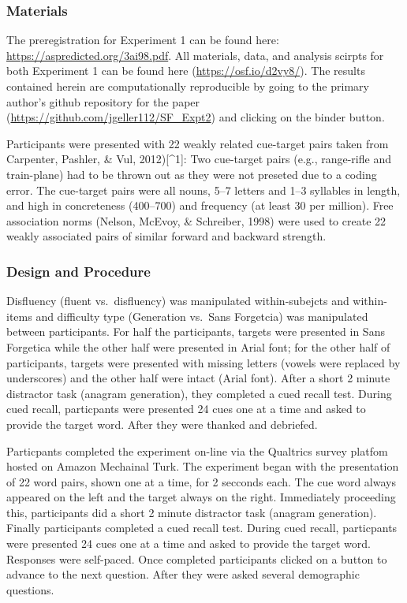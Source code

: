 \documentclass[doc]{apa6}
\begin{document}
\hypertarget{materials}{%
\subsubsection{Materials}\label{materials}}

The preregistration for Experiment 1 can be found here: \url{https://aspredicted.org/3ai98.pdf}. All materials, data, and analysis scirpts for both Experiment 1 can be found here (\url{https://osf.io/d2vy8/}). The results contained herein are computationally reproducible by going to the primary author's github repository for the paper (\url{https://github.com/jgeller112/SF_Expt2}) and clicking on the binder button.

Participants were presented with 22 weakly related cue-target pairs taken from Carpenter, Pashler, \& Vul, 2012){[}\^{}1{]}: Two cue-target pairs (e.g., range-rifle and train-plane) had to be thrown out as they were not preseted due to a coding error. The cue-target pairs were all nouns, 5--7 letters and 1--3 syllables in length, and high in concreteness (400--700) and frequency (at least 30 per million). Free association norms (Nelson, McEvoy, \& Schreiber, 1998) were used to create 22 weakly associated pairs of similar forward and backward strength.

\hypertarget{design-and-procedure}{%
\subsubsection{Design and Procedure}\label{design-and-procedure}}

Disfluency (fluent vs.~disfluency) was manipulated within-subejcts and within-items and difficulty type (Generation vs.~Sans Forgetcia) was manipulated between participants. For half the participants, targets were presented in Sans Forgetica while the other half were presented in Arial font; for the other half of participants, targets were presented with missing letters (vowels were replaced by underscores) and the other half were intact (Arial font). After a short 2 minute distractor task (anagram generation), they completed a cued recall test. During cued recall, particpants were presented 24 cues one at a time and asked to provide the target word. After they were thanked and debriefed.

Particpants completed the experiment on-line via the Qualtrics survey platfom hosted on Amazon Mechainal Turk. The experiment began with the presentation of 22 word pairs, shown one at a time, for 2 secconds each. The cue word always appeared on the left and the target always on the right. Immediately proceeding this, participants did a short 2 minute distractor task (anagram generation). Finally participants completed a cued recall test. During cued recall, particpants were presented 24 cues one at a time and asked to provide the target word. Responses were self-paced. Once completed participants clicked on a button to advance to the next question. After they were asked several demographic questions.
\end{document}
